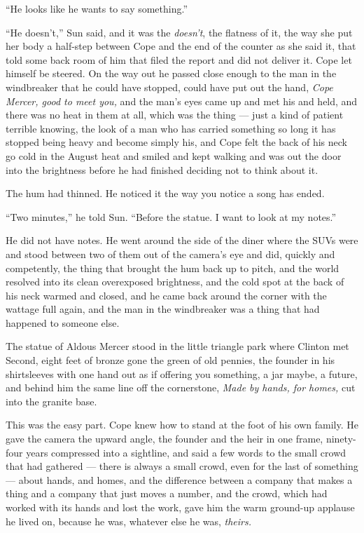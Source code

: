 \documentclass[11pt,openany]{book}
\newcommand{\scenebreak}{\par\vspace{0.5\baselineskip}\begin{center}\textasteriskcentered\quad\textasteriskcentered\quad\textasteriskcentered\end{center}\vspace{0.5\baselineskip}\par}
\begin{document}
``He looks like he wants to say something.''

``He doesn't,'' Sun said, and it was the \textit{doesn't}, the flatness of it, the way she put her body a half-step between Cope and the end of the counter as she said it, that told some back room of him that filed the report and did not deliver it. Cope let himself be steered. On the way out he passed close enough to the man in the windbreaker that he could have stopped, could have put out the hand, \textit{Cope Mercer, good to meet you,} and the man's eyes came up and met his and held, and there was no heat in them at all, which was the thing --- just a kind of patient terrible knowing, the look of a man who has carried something so long it has stopped being heavy and become simply his, and Cope felt the back of his neck go cold in the August heat and smiled and kept walking and was out the door into the brightness before he had finished deciding not to think about it.

The hum had thinned. He noticed it the way you notice a song has ended.

``Two minutes,'' he told Sun. ``Before the statue. I want to look at my notes.''

He did not have notes. He went around the side of the diner where the SUVs were and stood between two of them out of the camera's eye and did, quickly and competently, the thing that brought the hum back up to pitch, and the world resolved into its clean overexposed brightness, and the cold spot at the back of his neck warmed and closed, and he came back around the corner with the wattage full again, and the man in the windbreaker was a thing that had happened to someone else.


\scenebreak


The statue of Aldous Mercer stood in the little triangle park where Clinton met Second, eight feet of bronze gone the green of old pennies, the founder in his shirtsleeves with one hand out as if offering you something, a jar maybe, a future, and behind him the same line off the cornerstone, \textit{Made by hands, for homes,} cut into the granite base.

This was the easy part. Cope knew how to stand at the foot of his own family. He gave the camera the upward angle, the founder and the heir in one frame, ninety-four years compressed into a sightline, and said a few words to the small crowd that had gathered --- there is always a small crowd, even for the last of something --- about hands, and homes, and the difference between a company that makes a thing and a company that just moves a number, and the crowd, which had worked with its hands and lost the work, gave him the warm ground-up applause he lived on, because he was, whatever else he was, \textit{theirs.}
\end{document}
